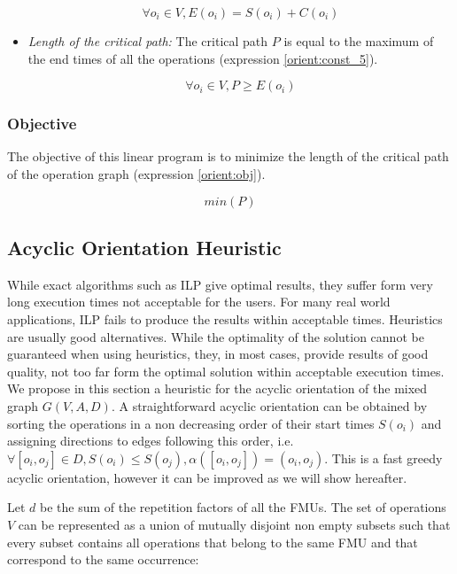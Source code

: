 \begin{itemize}
\begin{equation}
\forall o_i \in V, E(o_i) = S(o_i) + C(o_i)
\label{orient:const_4}
\end{equation} 

\item \textit{Length of the critical path:} The critical path $P$ is equal to the maximum of the end times of all the operations (expression \ref{orient:const_5}).

\begin{equation}
\forall o_i \in V, P \geq E(o_i)
\label{orient:const_5}
\end{equation}

\end{itemize}

\subsubsection{Objective}

The objective of this linear program is to minimize the length of the critical path of the operation graph (expression \ref{orient:obj}).

\begin{equation}
min(P)
\label{orient:obj}
\end{equation}


\subsection{Acyclic Orientation Heuristic}

While exact algorithms such as ILP give optimal results, they suffer form very long execution times not acceptable for the users. For many real world applications, ILP fails to produce the results within acceptable times. Heuristics are usually good alternatives. While the optimality of the solution cannot be guaranteed when using heuristics, they, in most cases, provide results of good quality, not too far form the optimal solution within acceptable execution times. We propose in this section a heuristic for the acyclic orientation of the mixed graph $G(V,A,D)$. A straightforward acyclic orientation can be obtained by sorting the operations in a non decreasing order of their start times $S(o_i)$ and assigning directions to edges following this order, i.e. $\forall [o_i,o_j] \in D, S(o_i) \leq S(o_j), \alpha([o_i,o_j]) = (o_i,o_j)$. This is a fast greedy acyclic orientation, however it can be improved as we will show hereafter.

Let $d$ be the sum of the repetition factors of all the FMUs. The set of operations $V$ can be represented as a union of mutually disjoint non empty subsets such that every subset contains all operations that belong to the same FMU and that correspond to the same occurrence:

